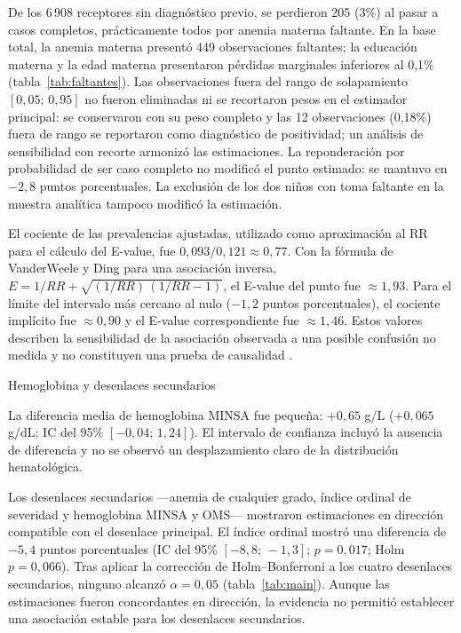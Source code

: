\documentclass[man,11pt,donotrepeattitle,floatsintext]{apa7}
\makeatletter
\renewcommand{\subsection}{\@startsection{subsection}{2}{\z@}%
    {\b@level@two@skip}{\e@level@two@skip}%
    {\normalfont\normalsize\bfseries\raggedright}}
\makeatother
\begin{document}
De los 6\,908 receptores sin diagnóstico previo, se perdieron 205 (3\%) al pasar a casos completos, prácticamente todos por anemia materna faltante. En la base total, la anemia materna presentó 449 observaciones faltantes; la educación materna y la edad materna presentaron pérdidas marginales inferiores al 0{,}1\% (tabla~\ref{tab:faltantes}). Las observaciones fuera del rango de solapamiento $[0{,}05;\,0{,}95]$ no fueron eliminadas ni se recortaron pesos en el estimador principal: se conservaron con su peso completo y las 12 observaciones (0{,}18\%) fuera de rango se reportaron como diagnóstico de positividad; un análisis de sensibilidad con recorte armonizó las estimaciones. La reponderación por probabilidad de ser caso completo no modificó el punto estimado: se mantuvo en $-2{,}8$ puntos porcentuales. La exclusión de los dos niños con toma faltante en la muestra analítica tampoco modificó la estimación.

El cociente de las prevalencias ajustadas, utilizado como aproximación al RR para el cálculo del E-value, fue $0{,}093/0{,}121 \approx 0{,}77$. Con la fórmula de VanderWeele y Ding para una asociación inversa, $E = 1/RR + \sqrt{(1/RR)\,(1/RR-1)}$, el E-value del punto fue $\approx 1{,}93$. Para el límite del intervalo más cercano al nulo ($-1{,}2$ puntos porcentuales), el cociente implícito fue $\approx 0{,}90$ y el E-value correspondiente fue $\approx 1{,}46$. Estos valores describen la sensibilidad de la asociación observada a una posible confusión no medida y no constituyen una prueba de causalidad \parencite{vanderweele2017}.


\subsection{Hemoglobina y desenlaces secundarios}

La diferencia media de hemoglobina MINSA fue pequeña: $+0{,}65$ g/L ($+0{,}065$ g/dL; IC del 95\% $[-0{,}04;\,1{,}24]$). El intervalo de confianza incluyó la ausencia de diferencia y no se observó un desplazamiento claro de la distribución hematológica.

Los desenlaces secundarios ---anemia de cualquier grado, índice ordinal de severidad y hemoglobina MINSA y OMS--- mostraron estimaciones en dirección compatible con el desenlace principal. El índice ordinal mostró una diferencia de $-5{,}4$ puntos porcentuales (IC del 95\% $[-8{,}8;\,-1{,}3]$; $p{=}0{,}017$; Holm $p{=}0{,}066$). Tras aplicar la corrección de Holm--Bonferroni a los cuatro desenlaces secundarios, ninguno alcanzó $\alpha{=}0{,}05$ (tabla~\ref{tab:main}). Aunque las estimaciones fueron concordantes en dirección, la evidencia no permitió establecer una asociación estable para los desenlaces secundarios.
\end{document}

